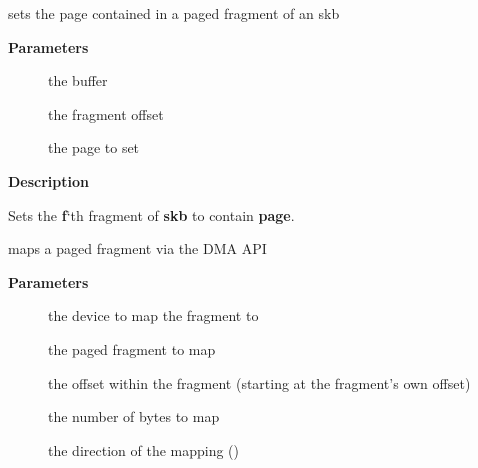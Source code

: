 \documentclass[a4paper,8pt,english]{sphinxmanual}
\begin{document}
\begin{fulllineitems}
\label{networking/kapi:c.skb_frag_set_page}
sets the page contained in a paged fragment of an skb

\end{fulllineitems}


\textbf{Parameters}
\begin{description}
\item[{}] \leavevmode
the buffer

\item[{}] \leavevmode
the fragment offset

\item[{}] \leavevmode
the page to set

\end{description}

\textbf{Description}

Sets the \textbf{f}`th fragment of \textbf{skb} to contain \textbf{page}.

\begin{fulllineitems}
\label{networking/kapi:c.skb_frag_dma_map}
maps a paged fragment via the DMA API

\end{fulllineitems}


\textbf{Parameters}
\begin{description}
\item[{}] \leavevmode
the device to map the fragment to

\item[{}] \leavevmode
the paged fragment to map

\item[{}] \leavevmode
the offset within the fragment (starting at the
fragment's own offset)

\item[{}] \leavevmode
the number of bytes to map

\item[{}] \leavevmode
the direction of the mapping ()

\end{description}
\end{document}
